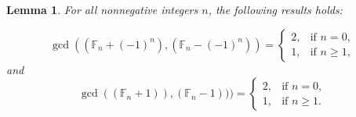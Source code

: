 \documentclass[pdflatex,sn-mathphys-num]{sn-jnl}%
\newtheorem{theorem}{Theorem}
\newtheorem{lemma}{Lemma}
\theoremstyle{thmstyleone}%
\theoremstyle{thmstyletwo}%
\theoremstyle{thmstylethree}%
\begin{document}
\begin{lemma}
 For all nonnegative integers $n$, the following results holds:

\begin{equation*}\gcd((\mathbb{F}_{n}+(-1)^n),(\mathbb{F}_{n}-(-1)^n))=
\begin{cases}
	\text{$2$},    & \text{if $n=0$,}\\
	\text{$1$},  & \text{if $n\geq 1$, }
\end{cases}
 \end{equation*}
and 
 \begin{equation*}\gcd((\mathbb{F}_{n}+1)),(\mathbb{F}_{n}-1)))=
\begin{cases}
	\text{$2$},    & \text{if $n=0$,}\\
	\text{$1$},  & \text{if $n\geq 1$. }
\end{cases}
 \end{equation*}
 
\end{lemma}



\end{document}
